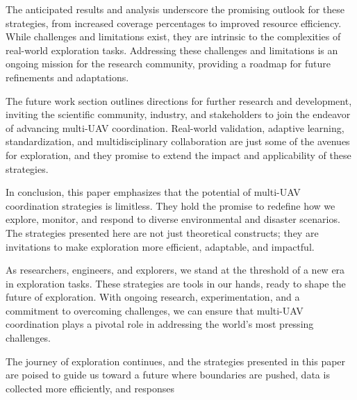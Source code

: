 \documentclass[sigconf]{acmart}
\begin{document}
The anticipated results and analysis underscore the promising outlook for these strategies, from increased coverage percentages to improved resource efficiency. While challenges and limitations exist, they are intrinsic to the complexities of real-world exploration tasks. Addressing these challenges and limitations is an ongoing mission for the research community, providing a roadmap for future refinements and adaptations.

The future work section outlines directions for further research and development, inviting the scientific community, industry, and stakeholders to join the endeavor of advancing multi-UAV coordination. Real-world validation, adaptive learning, standardization, and multidisciplinary collaboration are just some of the avenues for exploration, and they promise to extend the impact and applicability of these strategies.

In conclusion, this paper emphasizes that the potential of multi-UAV coordination strategies is limitless. They hold the promise to redefine how we explore, monitor, and respond to diverse environmental and disaster scenarios. The strategies presented here are not just theoretical constructs; they are invitations to make exploration more efficient, adaptable, and impactful.

As researchers, engineers, and explorers, we stand at the threshold of a new era in exploration tasks. These strategies are tools in our hands, ready to shape the future of exploration. With ongoing research, experimentation, and a commitment to overcoming challenges, we can ensure that multi-UAV coordination plays a pivotal role in addressing the world's most pressing challenges.

The journey of exploration continues, and the strategies presented in this paper are poised to guide us toward a future where boundaries are pushed, data is collected more efficiently, and responses \citeauthor{HybridCampos2017}








\end{document}
